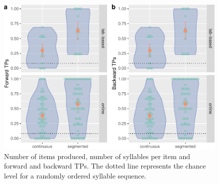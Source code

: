 \documentclass[
]{article}
\begin{document}
\begin{figure}

{\centering \includegraphics[width=0.8\linewidth]{segmentation_recall_combined_for_revision4_files/figure-latex/recall-general-measures-tp-plot-tps-1} 

}

\caption{Number of items produced, number of syllables per item and forward and backward TPs. The dotted line represents the chance level for a randomly ordered syllable sequence.}\label{fig:recall-general-measures-tp-plot-tps}
\end{figure}
\end{document}
